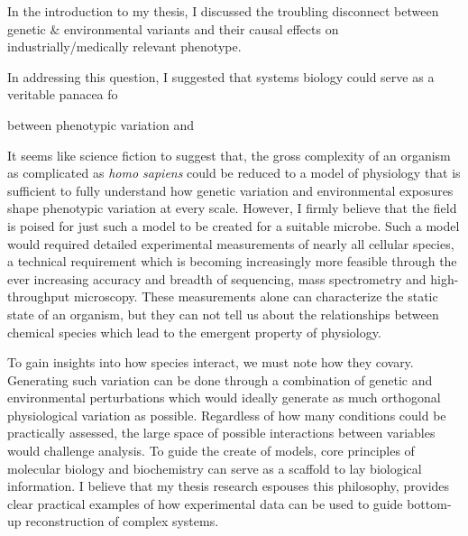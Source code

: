 In the introduction to my thesis, I discussed the troubling disconnect between genetic $\&$ environmental variants and their causal effects on industrially/medically relevant phenotype. 

In addressing this question, I suggested that systems biology could serve as a veritable panacea fo

between phenotypic variation and 

It seems like science fiction to suggest that, the gross complexity of an organism as complicated as \textit{homo sapiens} could be reduced to a model of physiology that is sufficient to fully understand how genetic variation and environmental exposures shape phenotypic variation at every scale. However, I firmly believe that the field is poised for just such a model to be created for a suitable microbe. Such a model would required detailed experimental measurements of nearly all cellular species, a technical requirement which is becoming increasingly more feasible through the ever increasing accuracy and breadth of sequencing, mass spectrometry and high-throughput microscopy. These measurements alone can characterize the static state of an organism, but they can not tell us about the relationships between chemical species which lead to the emergent property of physiology. 

To gain insights into how species interact, we must note how they covary. Generating such variation can be done through a combination of genetic and environmental perturbations which would ideally generate as much orthogonal physiological variation as possible. Regardless of how many conditions could be practically assessed, the large space of possible interactions between variables would challenge analysis. To guide the create of models, core principles of molecular biology and biochemistry can serve as a scaffold to lay biological information. I believe that my thesis research espouses this philosophy, provides clear practical examples of how experimental data can be used to guide bottom-up reconstruction of complex systems.

